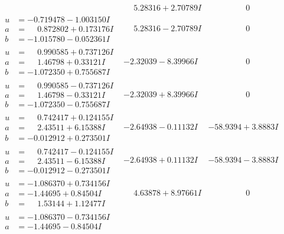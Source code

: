 \documentclass[1p]{elsarticle_modified}
\theoremstyle{definition}
\begin{document}
$$\begin{array}{c|c|c}
 & \phantom{-}5.28316 + 2.70789 I & \phantom{-0.000000 } 0 \\ \hline\begin{aligned}
u &= -0.719478 - 1.003150 I \\
a &= \phantom{-}0.872802 + 0.173176 I \\
b &= -1.015780 - 0.052361 I\end{aligned}
 & \phantom{-}5.28316 - 2.70789 I & \phantom{-0.000000 } 0 \\ \hline\begin{aligned}
u &= \phantom{-}0.990585 + 0.737126 I \\
a &= \phantom{-}1.46798 + 0.33121 I \\
b &= -1.072350 + 0.755687 I\end{aligned}
 & -2.32039 - 8.39966 I & \phantom{-0.000000 } 0 \\ \hline\begin{aligned}
u &= \phantom{-}0.990585 - 0.737126 I \\
a &= \phantom{-}1.46798 - 0.33121 I \\
b &= -1.072350 - 0.755687 I\end{aligned}
 & -2.32039 + 8.39966 I & \phantom{-0.000000 } 0 \\ \hline\begin{aligned}
u &= \phantom{-}0.742417 + 0.124155 I \\
a &= \phantom{-}2.43511 + 6.15388 I \\
b &= -0.012912 + 0.273501 I\end{aligned}
 & -2.64938 - 0.11132 I & -58.9394 + 3.8883 I \\ \hline\begin{aligned}
u &= \phantom{-}0.742417 - 0.124155 I \\
a &= \phantom{-}2.43511 - 6.15388 I \\
b &= -0.012912 - 0.273501 I\end{aligned}
 & -2.64938 + 0.11132 I & -58.9394 - 3.8883 I \\ \hline\begin{aligned}
u &= -1.086370 + 0.734156 I \\
a &= -1.44695 + 0.84504 I \\
b &= \phantom{-}1.53144 + 1.12477 I\end{aligned}
 & \phantom{-}4.63878 + 8.97661 I & \phantom{-0.000000 } 0 \\ \hline\begin{aligned}
u &= -1.086370 - 0.734156 I \\
a &= -1.44695 - 0.84504 I \\

\end{aligned}
\end{array}$$
\end{document}
